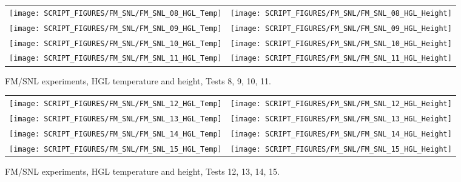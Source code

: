 \begin{figure}[p]
\begin{tabular*}{\textwidth}{l@{\extracolsep{\fill}}r}
\texttt{[image: SCRIPT\_FIGURES/FM\_SNL/FM\_SNL\_08\_HGL\_Temp]} &
\texttt{[image: SCRIPT\_FIGURES/FM\_SNL/FM\_SNL\_08\_HGL\_Height]} \\
\texttt{[image: SCRIPT\_FIGURES/FM\_SNL/FM\_SNL\_09\_HGL\_Temp]} &
\texttt{[image: SCRIPT\_FIGURES/FM\_SNL/FM\_SNL\_09\_HGL\_Height]} \\
\texttt{[image: SCRIPT\_FIGURES/FM\_SNL/FM\_SNL\_10\_HGL\_Temp]} &
\texttt{[image: SCRIPT\_FIGURES/FM\_SNL/FM\_SNL\_10\_HGL\_Height]} \\
\texttt{[image: SCRIPT\_FIGURES/FM\_SNL/FM\_SNL\_11\_HGL\_Temp]} &
\texttt{[image: SCRIPT\_FIGURES/FM\_SNL/FM\_SNL\_11\_HGL\_Height]}
\end{tabular*}
\caption[FM/SNL experiments, HGL temperature and height, Tests 8, 9, 10, 11]
{FM/SNL experiments, HGL temperature and height, Tests 8, 9, 10, 11.}
\label{FM_SNL_HGL_3}
\end{figure}

\begin{figure}[p]
\begin{tabular*}{\textwidth}{l@{\extracolsep{\fill}}r}
\texttt{[image: SCRIPT\_FIGURES/FM\_SNL/FM\_SNL\_12\_HGL\_Temp]} &
\texttt{[image: SCRIPT\_FIGURES/FM\_SNL/FM\_SNL\_12\_HGL\_Height]} \\
\texttt{[image: SCRIPT\_FIGURES/FM\_SNL/FM\_SNL\_13\_HGL\_Temp]} &
\texttt{[image: SCRIPT\_FIGURES/FM\_SNL/FM\_SNL\_13\_HGL\_Height]} \\
\texttt{[image: SCRIPT\_FIGURES/FM\_SNL/FM\_SNL\_14\_HGL\_Temp]} &
\texttt{[image: SCRIPT\_FIGURES/FM\_SNL/FM\_SNL\_14\_HGL\_Height]} \\
\texttt{[image: SCRIPT\_FIGURES/FM\_SNL/FM\_SNL\_15\_HGL\_Temp]} &
\texttt{[image: SCRIPT\_FIGURES/FM\_SNL/FM\_SNL\_15\_HGL\_Height]}
\end{tabular*}
\caption[FM/SNL experiments, HGL temperature and height, Tests 12, 13, 14, 15]
{FM/SNL experiments, HGL temperature and height, Tests 12, 13, 14, 15.}
\label{FM_SNL_HGL_4}
\end{figure}


